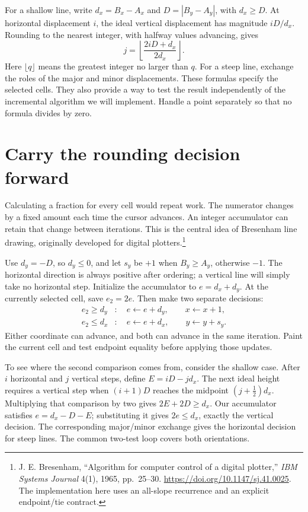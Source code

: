 For a shallow line, write $d_x=B_x-A_x$ and $D=|B_y-A_y|$, with $d_x\geq D$.
At horizontal displacement $i$, the ideal vertical displacement has magnitude
$iD/d_x$. Rounding to the nearest integer, with halfway values advancing, gives
\[
  j=\left\lfloor\frac{2iD+d_x}{2d_x}\right\rfloor.
\]
Here $\lfloor q\rfloor$ means the greatest integer no larger than $q$. For a steep
line, exchange the roles of the major and minor displacements. These formulas
specify the selected cells. They also provide a way to test the result independently
of the incremental algorithm we will implement. Handle a point separately so that
no formula divides by zero.

\section{Carry the rounding decision forward}

Calculating a fraction for every cell would repeat work. The numerator changes
by a fixed amount each time the cursor advances. An integer accumulator can retain
that change between iterations. This is the central idea of Bresenham line drawing,
originally developed for digital plotters.\footnote{J. E. Bresenham, ``Algorithm for
  computer control of a digital plotter,'' \emph{IBM Systems Journal} 4(1), 1965,
  pp.~25--30. \url{https://doi.org/10.1147/sj.41.0025}. The implementation here uses
  an all-slope recurrence and an explicit endpoint/tie contract.}

Use $d_y=-D$, so $d_y\leq0$, and let $s_y$ be $+1$ when $B_y\geq A_y$, otherwise
$-1$. The horizontal direction is always positive after ordering; a vertical line
will simply take no horizontal step. Initialize the accumulator to
$e=d_x+d_y$. At the currently selected cell, save $e_2=2e$. Then make two separate
decisions:
\[
  \begin{aligned}
    e_2\geq d_y & : \quad e\gets e+d_y,\qquad x\gets x+1,   \\
    e_2\leq d_x & : \quad e\gets e+d_x,\qquad y\gets y+s_y.
  \end{aligned}
\]
Either coordinate can advance, and both can advance in the same iteration. Paint
the current cell and test endpoint equality before applying those updates.

To see where the second comparison comes from, consider the shallow case. After
$i$ horizontal and $j$ vertical steps, define $E=iD-jd_x$. The next ideal height
requires a vertical step when $(i+1)D$ reaches the midpoint $(j+\tfrac12)d_x$.
Multiplying that comparison by two gives $2E+2D\geq d_x$. Our accumulator satisfies
$e=d_x-D-E$; substituting it gives $2e\leq d_x$, exactly the vertical decision.
The corresponding major/minor exchange gives the horizontal decision for steep
lines. The common two-test loop covers both orientations.

